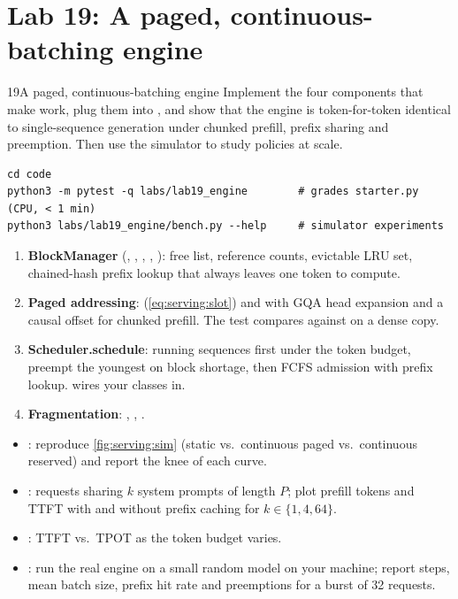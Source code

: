 \section{Lab 19: A paged, continuous-batching engine}\label{sec:serving:lab}
\begin{labbox}{19}{A paged, continuous-batching engine}
Implement the four components that make  work, plug them into ,
and show that the engine is token-for-token identical to single-sequence generation under chunked
prefill, prefix sharing and preemption. Then use the simulator to study policies at scale.

\begin{lstlisting}[style=shell]
cd code
python3 -m pytest -q labs/lab19_engine        # grades starter.py (CPU, < 1 min)
python3 labs/lab19_engine/bench.py --help     # simulator experiments
\end{lstlisting}

\begin{enumerate}
  \item \textbf{BlockManager} (, , , ,
    ): free list, reference counts, evictable LRU set, chained-hash prefix lookup that
    always leaves one token to compute.
  \item \textbf{Paged addressing}:  (\cref{eq:serving:slot}) and
     with GQA head expansion and a causal offset for chunked prefill. The test
    compares against  on a dense copy.
  \item \textbf{Scheduler.schedule}: running sequences first under the token budget, preempt the youngest
    on block shortage, then FCFS admission with prefix lookup.  wires your classes in.
  \item \textbf{Fragmentation}: , , .
\end{enumerate}

\begin{itemize}
  \item {}: reproduce \cref{fig:serving:sim} (static vs.\ continuous paged vs.\
    continuous reserved) and report the knee of each curve.
  \item {}: requests sharing $k$ system prompts of length $P$; plot prefill
    tokens and TTFT with and without prefix caching for $k\in\{1,4,64\}$.
  \item \code{bench.py --exp budget}: TTFT vs.\ TPOT as the token budget varies.
  \item \code{bench.py --exp engine}: run the real engine on a small random model on your machine; report
    steps, mean batch size, prefix hit rate and preemptions for a burst of 32 requests.
\end{itemize}


\end{labbox}
